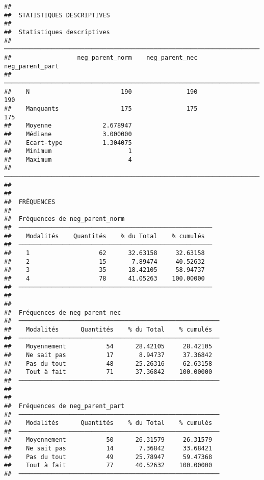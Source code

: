 \documentclass[
]{article}
\begin{document}
\begin{verbatim}
## 
##  STATISTIQUES DESCRIPTIVES
## 
##  Statistiques descriptives                                              
##  ────────────────────────────────────────────────────────────────────── 
##                  neg_parent_norm    neg_parent_nec    neg_parent_part   
##  ────────────────────────────────────────────────────────────────────── 
##    N                         190               190                190   
##    Manquants                 175               175                175   
##    Moyenne              2.678947                                        
##    Médiane              3.000000                                        
##    Ecart-type           1.304075                                        
##    Minimum                     1                                        
##    Maximum                     4                                        
##  ────────────────────────────────────────────────────────────────────── 
## 
## 
##  FRÉQUENCES
## 
##  Fréquences de neg_parent_norm                         
##  ───────────────────────────────────────────────────── 
##    Modalités    Quantités    % du Total    % cumulés   
##  ───────────────────────────────────────────────────── 
##    1                   62      32.63158     32.63158   
##    2                   15       7.89474     40.52632   
##    3                   35      18.42105     58.94737   
##    4                   78      41.05263    100.00000   
##  ───────────────────────────────────────────────────── 
## 
## 
##  Fréquences de neg_parent_nec                            
##  ─────────────────────────────────────────────────────── 
##    Modalités      Quantités    % du Total    % cumulés   
##  ─────────────────────────────────────────────────────── 
##    Moyennement           54      28.42105     28.42105   
##    Ne sait pas           17       8.94737     37.36842   
##    Pas du tout           48      25.26316     62.63158   
##    Tout à fait           71      37.36842    100.00000   
##  ─────────────────────────────────────────────────────── 
## 
## 
##  Fréquences de neg_parent_part                           
##  ─────────────────────────────────────────────────────── 
##    Modalités      Quantités    % du Total    % cumulés   
##  ─────────────────────────────────────────────────────── 
##    Moyennement           50      26.31579     26.31579   
##    Ne sait pas           14       7.36842     33.68421   
##    Pas du tout           49      25.78947     59.47368   
##    Tout à fait           77      40.52632    100.00000   
##  ───────────────────────────────────────────────────────
\end{verbatim}
\end{document}
